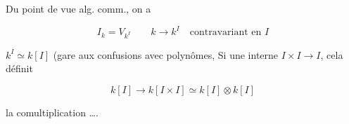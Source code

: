 Du point de vue alg. comm., on a


\[
I_k=V_{k^I}\qquad k\to k^I\quad\text{contravariant en $I$}
\]


$k^I\simeq k[I]$  (gare aux confusions avec polynômes, Si   une   interne $I\times I\to I$, cela définit

\[
k[I]\longrightarrow k[I\times I]\simeq k[I]\otimes k[I]
\]

la comultiplication \ldots.

